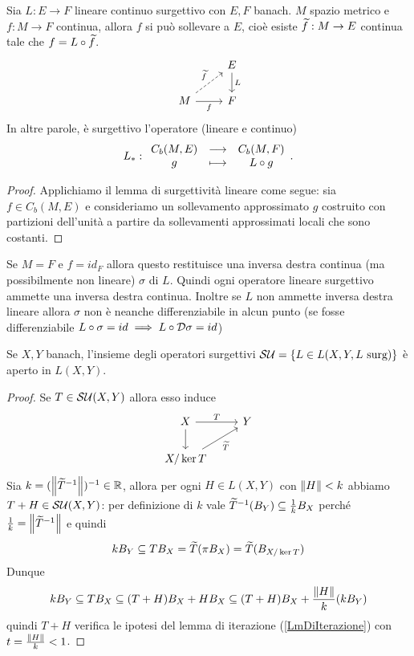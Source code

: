 \begin{theorem}\label{ThSollevamentoOperatoriLineariBartles-Groves}
Sia $L:E\to F$ lineare continuo surgettivo con $E,F$ banach. $M$ spazio metrico e $f:M\to F$ continua, allora $f$ si pu\`o sollevare a $E$, cio\`e esiste $\widetilde{f}:M\to E$ continua tale che $f=L\circ \widetilde{f}$.
\[\begin{tikzcd}
	& E \\
	M & F
	\arrow["L", from=1-2, to=2-2]
	\arrow["{\wt f}", dashed, from=2-1, to=1-2]
	\arrow["f"', from=2-1, to=2-2]
\end{tikzcd}\]
In altre parole, \`e surgettivo l'operatore (lineare e continuo)
\[L_\ast:\begin{array}{ccc} {C_b(M,E)} & \longrightarrow & {C_b(M,F)}\\ {g} & \longmapsto & {L\circ g} \end{array}.\]
\end{theorem}
\begin{proof}
Applichiamo il lemma di surgettivit\`a lineare come segue: sia $f\in C_b(M,E)$ e consideriamo un sollevamento approssimato $g$ costruito con partizioni dell'unit\`a a partire da sollevamenti approssimati locali che sono costanti. 
\end{proof}
\begin{remark}
Se $M=F$ e $f=id_F$ allora questo restituisce una inversa destra continua  (ma possibilmente non lineare) $\sigma$ di $L$. Quindi ogni operatore lineare surgettivo ammette una inversa destra continua. Inoltre se $L$ non ammette inversa destra lineare allora $\sigma$ non \`e neanche differenziabile in alcun punto (se fosse differenziabile $L\circ \sigma=id\implies L\circ \mathcal{D}\sigma=id$)
\end{remark}

\begin{remark}
Se $X,Y$ banach, l'insieme degli operatori surgettivi $\mathcal{S}\mathcal{U}=\left\{{L\in L(X,Y,L\text{ surg})}\right\}$ \`e aperto in $L(X,Y)$. 
\end{remark}
\begin{proof}
Se $T\in \mathcal{S}\mathcal{U}(X,Y)$ allora esso induce
\[\begin{tikzcd}
	X & Y \\
	{X/\ker T}
	\arrow["T", from=1-1, to=1-2]
	\arrow[from=1-1, to=2-1]
	\arrow["{\wt T}"', from=2-1, to=1-2]
\end{tikzcd}\]
Sia $k=(\left\Vert{\widetilde{T}^{-1}}\right\Vert)^{-1}\in \mathbb{R}$, allora per ogni $H\in L(X,Y)$ con $\left\Vert{H}\right\Vert<k$ abbiamo $T+H\in \mathcal{S}\mathcal{U}(X,Y)$: per definizione di $k$ vale $\widetilde{T}^{-1}(B_Y)\subseteq \frac1k B_X$ perch\'e $\frac1k=\left\Vert{\widetilde{T}^{-1}}\right\Vert$ e quindi
\[kB_Y\subseteq TB_X=\widetilde{T}(\pi B_X)=\widetilde{T}(B_{X/\ker T})\]
Dunque 
\[kB_Y\subseteq TB_X\subseteq (T+H)B_X+HB_X\subseteq (T+H)B_X+\frac{\left\Vert{H}\right\Vert}k(kB_Y)\]
quindi $T+H$ verifica le ipotesi del lemma di iterazione (\ref{LmDiIterazione}) con $t=\frac{\left\Vert{H}\right\Vert}k<1$.
\end{proof}


